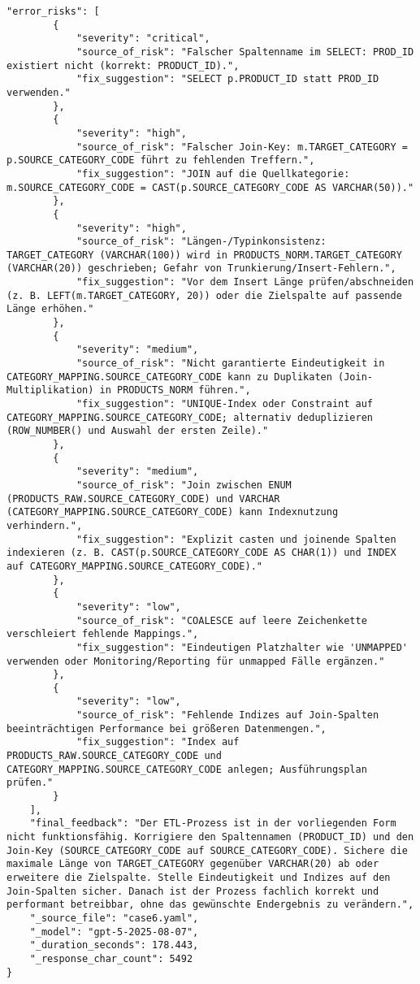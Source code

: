 \begin{lstlisting}[caption={Ausgabe: GPT-5 Anwendungsfall 6 Robustheitsdurchlauf},label={gpt_case6_prompt3}]
    "error_risks": [
        {
            "severity": "critical",
            "source_of_risk": "Falscher Spaltenname im SELECT: PROD_ID existiert nicht (korrekt: PRODUCT_ID).",
            "fix_suggestion": "SELECT p.PRODUCT_ID statt PROD_ID verwenden."
        },
        {
            "severity": "high",
            "source_of_risk": "Falscher Join-Key: m.TARGET_CATEGORY = p.SOURCE_CATEGORY_CODE führt zu fehlenden Treffern.",
            "fix_suggestion": "JOIN auf die Quellkategorie: m.SOURCE_CATEGORY_CODE = CAST(p.SOURCE_CATEGORY_CODE AS VARCHAR(50))."
        },
        {
            "severity": "high",
            "source_of_risk": "Längen-/Typinkonsistenz: TARGET_CATEGORY (VARCHAR(100)) wird in PRODUCTS_NORM.TARGET_CATEGORY (VARCHAR(20)) geschrieben; Gefahr von Trunkierung/Insert-Fehlern.",
            "fix_suggestion": "Vor dem Insert Länge prüfen/abschneiden (z. B. LEFT(m.TARGET_CATEGORY, 20)) oder die Zielspalte auf passende Länge erhöhen."
        },
        {
            "severity": "medium",
            "source_of_risk": "Nicht garantierte Eindeutigkeit in CATEGORY_MAPPING.SOURCE_CATEGORY_CODE kann zu Duplikaten (Join-Multiplikation) in PRODUCTS_NORM führen.",
            "fix_suggestion": "UNIQUE-Index oder Constraint auf CATEGORY_MAPPING.SOURCE_CATEGORY_CODE; alternativ deduplizieren (ROW_NUMBER() und Auswahl der ersten Zeile)."
        },
        {
            "severity": "medium",
            "source_of_risk": "Join zwischen ENUM (PRODUCTS_RAW.SOURCE_CATEGORY_CODE) und VARCHAR (CATEGORY_MAPPING.SOURCE_CATEGORY_CODE) kann Indexnutzung verhindern.",
            "fix_suggestion": "Explizit casten und joinende Spalten indexieren (z. B. CAST(p.SOURCE_CATEGORY_CODE AS CHAR(1)) und INDEX auf CATEGORY_MAPPING.SOURCE_CATEGORY_CODE)."
        },
        {
            "severity": "low",
            "source_of_risk": "COALESCE auf leere Zeichenkette verschleiert fehlende Mappings.",
            "fix_suggestion": "Eindeutigen Platzhalter wie 'UNMAPPED' verwenden oder Monitoring/Reporting für unmapped Fälle ergänzen."
        },
        {
            "severity": "low",
            "source_of_risk": "Fehlende Indizes auf Join-Spalten beeinträchtigen Performance bei größeren Datenmengen.",
            "fix_suggestion": "Index auf PRODUCTS_RAW.SOURCE_CATEGORY_CODE und CATEGORY_MAPPING.SOURCE_CATEGORY_CODE anlegen; Ausführungsplan prüfen."
        }
    ],
    "final_feedback": "Der ETL-Prozess ist in der vorliegenden Form nicht funktionsfähig. Korrigiere den Spaltennamen (PRODUCT_ID) und den Join-Key (SOURCE_CATEGORY_CODE auf SOURCE_CATEGORY_CODE). Sichere die maximale Länge von TARGET_CATEGORY gegenüber VARCHAR(20) ab oder erweitere die Zielspalte. Stelle Eindeutigkeit und Indizes auf den Join-Spalten sicher. Danach ist der Prozess fachlich korrekt und performant betreibbar, ohne das gewünschte Endergebnis zu verändern.",
    "_source_file": "case6.yaml",
    "_model": "gpt-5-2025-08-07",
    "_duration_seconds": 178.443,
    "_response_char_count": 5492
}
\end{lstlisting}

